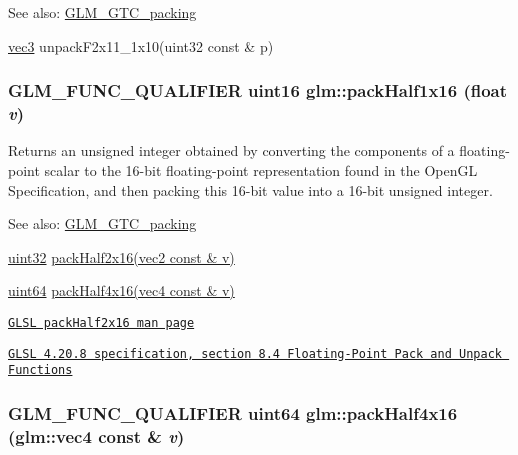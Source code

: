 \begin{Desc}
\item[See also:]\hyperlink{group__gtc__packing}{GLM\_\-GTC\_\-packing} 

\hyperlink{group__core__types_g1c47e8b3386109bc992b6c48e91b0be7}{vec3} unpackF2x11\_\-1x10(uint32 const \& p) \end{Desc}
\hypertarget{group__gtc__packing_gba534b320836a35372e00af5771dd1a2}{
\subsubsection[packHalf1x16]{\setlength{\rightskip}{0pt plus 5cm}GLM\_\-FUNC\_\-QUALIFIER uint16 glm::packHalf1x16 (float {\em v})}}
\label{group__gtc__packing_gba534b320836a35372e00af5771dd1a2}


Returns an unsigned integer obtained by converting the components of a floating-point scalar to the 16-bit floating-point representation found in the OpenGL Specification, and then packing this 16-bit value into a 16-bit unsigned integer.

\begin{Desc}
\item[See also:]\hyperlink{group__gtc__packing}{GLM\_\-GTC\_\-packing} 

\hyperlink{group__gtc__type__precision_g202b6a53c105fcb7e531f9b443518451}{uint32} \hyperlink{group__core__func__packing_g082f6dd65f73a547ed3067ef00be036f}{packHalf2x16(vec2 const \& v)} 

\hyperlink{group__gtc__type__precision_ge3632bf9b37da66233d78930dd06378a}{uint64} \hyperlink{group__gtc__packing_g8104f0b719b7792491f2b789a6dd6f96}{packHalf4x16(vec4 const \& v)} 

\href{http://www.opengl.org/sdk/docs/manglsl/xhtml/packHalf2x16.xml}{\tt GLSL packHalf2x16 man page} 

\href{http://www.opengl.org/registry/doc/GLSLangSpec.4.20.8.pdf}{\tt GLSL 4.20.8 specification, section 8.4 Floating-Point Pack and Unpack Functions} \end{Desc}
\hypertarget{group__gtc__packing_g8104f0b719b7792491f2b789a6dd6f96}{
\subsubsection[packHalf4x16]{\setlength{\rightskip}{0pt plus 5cm}GLM\_\-FUNC\_\-QUALIFIER uint64 glm::packHalf4x16 ({\bf glm::vec4} const \& {\em v})}}
\label{group__gtc__packing_g8104f0b719b7792491f2b789a6dd6f96}


